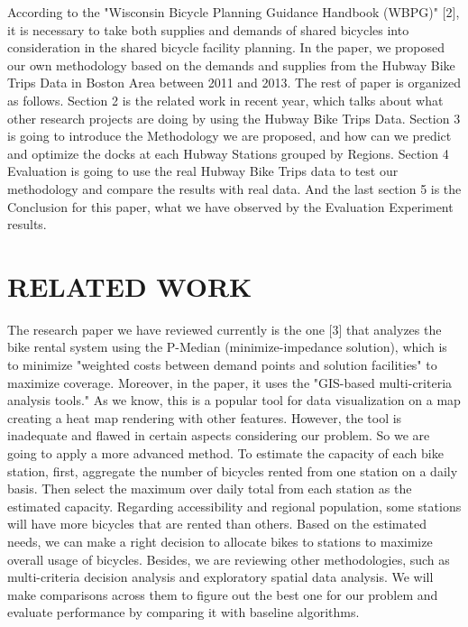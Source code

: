 \documentclass[journal, letterpaper]{IEEEtran}
\begin{document}


According to the "Wisconsin Bicycle Planning Guidance Handbook (WBPG)" [2], it is necessary to take both supplies and demands of shared bicycles into consideration in the shared bicycle facility planning. In the paper, we proposed our own methodology based on the demands and supplies from the Hubway Bike Trips Data in Boston Area between 2011 and 2013. The rest of paper is organized as follows. Section 2 is the related work in recent year, which talks about what other research projects are doing by using the Hubway Bike Trips Data. Section 3 is going to introduce the Methodology we are proposed, and how can we predict and optimize the docks at each Hubway Stations grouped by Regions. Section 4 Evaluation is going to use the real Hubway Bike Trips data to test our methodology and compare the results with real data. And the last section 5 is the Conclusion for this paper, what we have observed by the Evaluation Experiment results. 

\section{RELATED WORK}
\large
The research paper we have reviewed currently is the one [3] that analyzes the bike rental system using the P-Median (minimize-impedance solution), which is to minimize "weighted costs between demand points and solution facilities" to maximize coverage. Moreover, in the paper, it uses the "GIS-based multi-criteria analysis tools." As we know, this is a popular tool for data visualization on a map creating a heat map rendering with other features. However, the tool is inadequate and flawed in certain aspects considering our problem. So we are going to apply a more advanced method. To estimate the capacity of each bike station, first, aggregate the number of bicycles rented from one station on a daily basis. Then select the maximum over daily total from each station as the estimated capacity. Regarding accessibility and regional population, some stations will have more bicycles that are rented than others. Based on the estimated needs, we can make a right decision to allocate bikes to stations to maximize overall usage of bicycles. Besides, we are reviewing other methodologies, such as multi-criteria decision analysis and exploratory spatial data analysis. We will make comparisons across them to figure out the best one for our problem and evaluate performance by comparing it with baseline algorithms.
\end{document}
